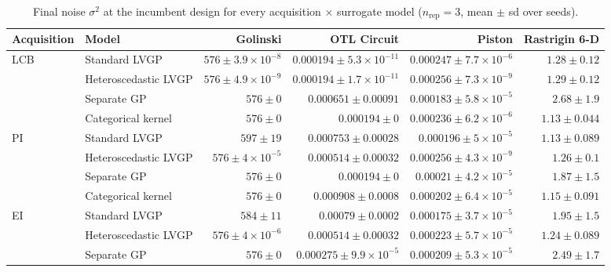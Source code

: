 \begin{table}[htbp]
\centering
\small
\setlength{\tabcolsep}{4pt}
\setlength{\fboxsep}{2pt}
\caption{Final noise $\sigma^2$ at the incumbent design for every acquisition $\times$ surrogate model ($n_{\mathrm{rep}}=3$, mean $\pm$ sd over seeds).}
\label{tab:noise_nrep03}
\begin{tabular}{llrrrr}
\toprule
Acquisition & Model & Golinski & OTL Circuit & Piston & Rastrigin 6-D \\
\midrule
LCB & Standard LVGP & $576 \pm 3.9{\times}10^{-8}$ & $0.000194 \pm 5.3{\times}10^{-11}$ & $0.000247 \pm 7.7{\times}10^{-6}$ & $1.28 \pm 0.12$ \\
 & Heteroscedastic LVGP & $576 \pm 4.9{\times}10^{-9}$ & $0.000194 \pm 1.7{\times}10^{-11}$ & $0.000256 \pm 7.3{\times}10^{-9}$ & $1.29 \pm 0.12$ \\
 & Separate GP & \colorbox{green!20}{{\boldmath$576 \pm 0$}} & $0.000651 \pm 0.00091$ & {\boldmath$0.000183 \pm 5.8{\times}10^{-5}$} & $2.68 \pm 1.9$ \\
 & Categorical kernel & \colorbox{green!20}{{\boldmath$576 \pm 0$}} & \colorbox{green!20}{{\boldmath$0.000194 \pm 0$}} & $0.000236 \pm 6.2{\times}10^{-6}$ & {\boldmath$1.13 \pm 0.044$} \\
\midrule
PI & Standard LVGP & $597 \pm 19$ & $0.000753 \pm 0.00028$ & {\boldmath$0.000196 \pm 5{\times}10^{-5}$} & {\boldmath$1.13 \pm 0.089$} \\
 & Heteroscedastic LVGP & $576 \pm 4{\times}10^{-5}$ & $0.000514 \pm 0.00032$ & $0.000256 \pm 4.3{\times}10^{-9}$ & $1.26 \pm 0.1$ \\
 & Separate GP & \colorbox{green!20}{{\boldmath$576 \pm 0$}} & \colorbox{green!20}{{\boldmath$0.000194 \pm 0$}} & $0.00021 \pm 4.2{\times}10^{-5}$ & $1.87 \pm 1.5$ \\
 & Categorical kernel & \colorbox{green!20}{{\boldmath$576 \pm 0$}} & $0.000908 \pm 0.0008$ & $0.000202 \pm 6.4{\times}10^{-5}$ & $1.15 \pm 0.091$ \\
\midrule
EI & Standard LVGP & $584 \pm 11$ & $0.00079 \pm 0.0002$ & $0.000175 \pm 3.7{\times}10^{-5}$ & $1.95 \pm 1.5$ \\
 & Heteroscedastic LVGP & $576 \pm 4{\times}10^{-6}$ & $0.000514 \pm 0.00032$ & $0.000223 \pm 5.7{\times}10^{-5}$ & $1.24 \pm 0.089$ \\
 & Separate GP & \colorbox{green!20}{{\boldmath$576 \pm 0$}} & {\boldmath$0.000275 \pm 9.9{\times}10^{-5}$} & $0.000209 \pm 5.3{\times}10^{-5}$ & $2.49 \pm 1.7$ \\

\end{tabular}
\end{table}

